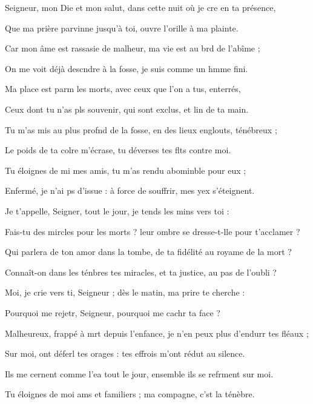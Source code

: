 \item Seigneur, mon Die et mon salut,\psstar{} dans cette nuit où je cre en ta présence,
\item Que ma prière parvinne jusqu’à toi,\psstar{} ouvre l’orille à ma plainte.
\item Car mon âme est rassasie de malheur,\psstar{} ma vie est au brd de l’abîme ;
\item On me voit déjà descndre à la fosse,\psstar{} je suis comme un hmme fini.
\item Ma place est parm les morts,\psstar{} avec ceux que l’on a tus, enterrés,
\item Ceux dont tu n’as pls souvenir,\psstar{} qui sont exclus, et lin de ta main.
\item Tu m’as mis au plus profnd de la fosse,\psstar{} en des lieux englouts, ténébreux ;
\item Le poids de ta colre m’écrase,\psstar{} tu déverses tes flts contre moi.
\item Tu éloignes de mi mes amis,\psstar{} tu m’as rendu abominble pour eux ;
\item Enfermé, je n’ai ps d’issue :\psstar{} à force de souffrir, mes yex s’éteignent.
\item Je t’appelle, Seigner, tout le jour,\psstar{} je tends les mins vers toi :
\item Fais-tu des mircles pour les morts ?\psstar{} leur ombre se dresse-t-lle pour t’acclamer ?
\item Qui parlera de ton amor dans la tombe,\psstar{} de ta fidélité au royame de la mort ?
\item Connaît-on dans les ténbres tes miracles,\psstar{} et ta justice, au pas de l’oubli ?
\item Moi, je crie vers ti, Seigneur ;\psstar{} dès le matin, ma prire te cherche :
\item Pourquoi me rejetr, Seigneur,\psstar{} pourquoi me cachr ta face ?
\item Malheureux, frappé à mrt depuis l’enfance,\psstar{} je n’en peux plus d’endurr tes fléaux ;
\item Sur moi, ont déferl tes orages :\psstar{} tes effrois m’ont rédut au silence.
\item Ils me cernent comme l’ea tout le jour,\psstar{} ensemble ils se refrment sur moi.
\item Tu éloignes de moi ams et familiers ;\psstar{} ma compagne, c’st la ténèbre.
